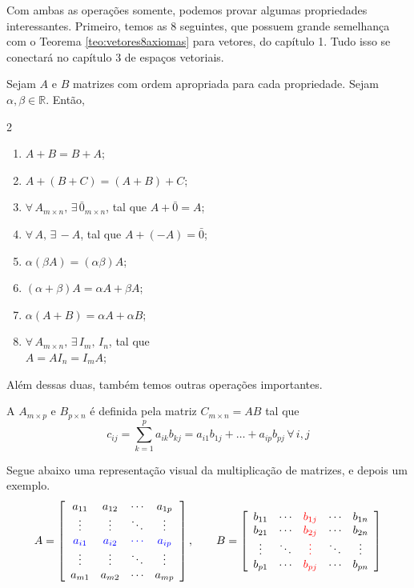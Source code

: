 \documentclass[../main.tex]{subfiles}
\begin{document}
		Com ambas as operações somente, podemos provar algumas propriedades interessantes. Primeiro, temos as 8 seguintes, que possuem grande semelhança com o Teorema \ref{teo:vetores8axiomas} para vetores, do capítulo 1. Tudo isso se conectará no capítulo 3 de espaços vetoriais.
		\begin{teorema}
			Sejam $A$ e $B$ matrizes com ordem apropriada para cada propriedade. Sejam $\alpha, \beta\in \mathbb{R}$. Então,
			\begin{multicols}{2}
				\begin{enumerate}[label=\roman*)]
					\item $A+B=B+A$;
					\item $A+(B+C)=(A+B)+C$;
					\item $\forall\, A_{m\times n}, \, \exists\, \bar{0}_{m\times n}$, tal que $A+\bar{0}=A$;
					\item $\forall\,  A,\, \exists\, -A$, tal que $A+(-A)=\bar{0}$;
					\item $\alpha(\beta A)=(\alpha \beta)A$;
					\item $(\alpha+\beta)A=\alpha A+\beta A$;
					\item $\alpha(A+B)=\alpha A+\alpha B$;
					\item $\forall\, A_{m\times n}, \, \exists\, I_m,\, I_n$, tal que \\ $A=AI_n=I_mA$;
				\end{enumerate}
			\end{multicols} 
		\end{teorema}
		
		Além dessas duas, também temos outras operações importantes.
		\begin{definicao}
			A  $A_{m\times p}$ e $B_{p\times n}$ é definida pela matriz $C_{m\times n}=AB$ tal que
			\[
			c_{ij}=\sum_{k=1}^{p} a_{ik}b_{kj}=a_{i1}b_{1j}+\dots 	+a_{ip}b_{pj}\, \forall\, i,j
			\]
		\end{definicao}
		Segue abaixo uma representação visual da multiplicação de matrizes, e depois um exemplo.
		\[
		A=
		\left[
		\begin{array}{cccc}
			a_{11} & a_{12} & \cdots & a_{1p}\\
			\vdots & \vdots & \ddots & \vdots\\
			{\color{blue}a_{i1}} & {\color{blue}a_{i2}} & {\color{blue}\cdots} & {\color{blue}a_{ip}}\\
			\vdots & \vdots & \ddots & \vdots\\
			a_{m1} & a_{m2} & \cdots & a_{mp}
		\end{array}
		\right],
		\qquad
		B=
		\left[
		\begin{array}{ccccc}
			b_{11} & \cdots & {\color{red}b_{1j}} & \cdots & b_{1n}\\
			b_{21} & \cdots & {\color{red}b_{2j}} & \cdots & b_{2n}\\
			\vdots & \ddots & {\color{red}\vdots} & \ddots & \vdots\\
			b_{p1} & \cdots & {\color{red}b_{pj}} & \cdots & b_{pn}
		\end{array}
		\right]
		\]
		
\end{document}
